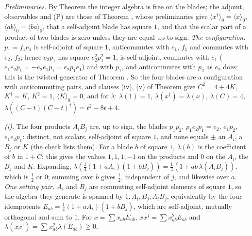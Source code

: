 \emph{Preliminaries.} By Theorem  the integer algebra is free on the blades; the adjoint, observables and (P) are those of Theorem , whose preliminaries give $\langle x^{\dagger}\rangle_{0} = \langle x\rangle_{0}$, $\langle ab\rangle_{0} = \langle ba\rangle_{0}$, that a self-adjoint blade has square $1$, and that the scalar part of a product of two blades is zero unless they are equal up to sign. \emph{The configuration.} $p_{1} = f_{1}e_{1}$ is self-adjoint of square $1$, anticommutes with $e_{1}$, $f_{1}$ and commutes with $e_{2}$, $f_{2}$; hence $e_{2}p_{1}$ has square $e_{2}^{2}p_{1}^{2} = 1$, is self-adjoint, commutes with $e_{1}$ ($e_{1}e_{2}p_{1} = -e_{2}e_{1}p_{1} = e_{2}p_{1}e_{1}$) and with $p_{1}$, and anticommutes with $p_{2}$ as $e_{2}$ does; this is the twisted generator of Theorem . So the four blades are a configuration with anticommuting pairs, and clauses (iv), (v) of Theorem  give $C^{2} = 4 + 4K$, $K^{\dagger} = K$, $K^{2} = 1$, $\langle K\rangle_{0} = 0$, and for $\lambda$: $\lambda(1) = 1$, $\lambda(x^{\dagger}) = \lambda(x)$, $\lambda(C) = 4$, $\lambda((C - t)(C - t)^{\dagger}) = t^{2} - 8t + 4$.

\emph{(i).} The four products $A_{i}B_{j}$ are, up to sign, the blades $p_{1}p_{2}$, $p_{1}e_{2}p_{1} = e_{2}$, $e_{1}p_{2}$, $e_{1}e_{2}p_{1}$: distinct, not scalars, self-adjoint of square $1$, and none equals $\pm$ an $A_{i}$, a $B_{j}$ or $K$ (the check lists them). For a blade $b$ of square $1$, $\lambda(b)$ is the coefficient of $b$ in $1 + C$: this gives the values $1, 1, 1, -1$ on the products and $0$ on the $A_{i}$, the $B_{j}$ and $K$. Expanding, $\lambda(\tfrac14(1 + aA_{i})(1 + bB_{j})) = \tfrac14(1 + ab\,\lambda(A_{i}B_{j}))$, which is $\tfrac12$ or $0$; summing over $b$ gives $\tfrac12$, independent of $j$, and likewise over $a$. \emph{One setting pair.} $A_{i}$ and $B_{j}$ are commuting self-adjoint elements of square $1$, so the algebra they generate is spanned by $1, A_{i}, B_{j}, A_{i}B_{j}$, equivalently by the four idempotents $E_{ab} = \tfrac14(1 + aA_{i})(1 + bB_{j})$, which are self-adjoint, mutually orthogonal and sum to $1$. For $x = \sum x_{ab}E_{ab}$, $xx^{\dagger} = \sum x_{ab}^{2}E_{ab}$ and $\lambda(xx^{\dagger}) = \sum x_{ab}^{2}\lambda(E_{ab}) \ge 0$.

